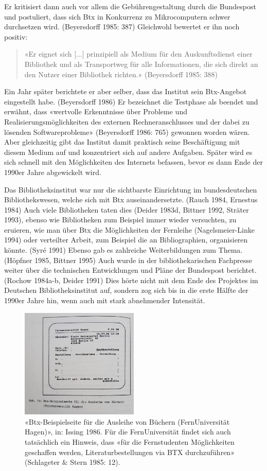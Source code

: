 \documentclass[a4paper,
fontsize=11pt,
oneside,
numbers=noperiodatend,
parskip=half-,
bibliography=totoc,
final
]{scrartcl}
\begin{document}
Er kritisiert dann auch vor allem die Gebührengestaltung durch die
Bundespost und postuliert, dass sich Btx in Konkurrenz zu Mikrocomputern
schwer durchsetzen wird. (Beyersdorff 1985: 387) Gleichwohl bewertet er
ihn noch positiv:

\begin{quote}
«Er eignet sich {[}...{]} prinzipiell als Medium für den Auskunftsdienst
einer Bibliothek und als Transportweg für alle Informationen, die sich
direkt an den Nutzer einer Bibliothek richten.» (Beyersdorff 1985: 388)
\end{quote}

Ein Jahr später berichtete er aber selber, dass das Institut sein
Btx-Angebot eingestellt habe. (Beyersdorff 1986) Er bezeichnet die
Testphase als beendet und erwähnt, dass «wertvolle Erkenntnisse über
Probleme und Realisierungsmöglichkeiten des externen Rechneranschlusses
und der dabei zu lösenden Softwareprobleme» (Beyersdorff 1986: 765)
gewonnen worden wären. Aber gleichzeitig gibt das Institut damit
praktisch seine Beschäftigung mit diesem Medium auf und konzentriert
sich auf andere Aufgaben. Später wird es sich schnell mit den
Möglichkeiten des Internets befassen, bevor es dann Ende der 1990er
Jahre abgewickelt wird.

Das Bibliotheksinstitut war nur die sichtbarste Einrichtung im
bundesdeutschen Bibliothekswesen, welche sich mit Btx auseinandersetzte.
(Rauch 1984, Ernestus 1984) Auch viele Bibliotheken taten dies (Deider
1983d, Bittner 1992, Sträter 1993), ebenso wie Bibliotheken zum Beispiel
immer wieder versuchten, zu eruieren, wie man über Btx die Möglichkeiten
der Fernleihe (Nagelsmeier-Linke 1994) oder verteilter Arbeit, zum
Beispiel die an Bibliographien, organisieren könnte. (Syré 1991) Ebenso
gab es zahlreiche Weiterbildungen zum Thema. (Höpfner 1985, Bittner
1995) Auch wurde in der bibliothekarischen Fachpresse weiter über die
technischen Entwicklungen und Pläne der Bundespost berichtet. (Rochow
1984a-b, Deider 1991) Dies hörte nicht mit dem Ende des Projektes im
Deutschen Bibliotheksinstitut auf, sondern zog sich bis in die erste
Hälfte der 1990er Jahre hin, wenn auch mit stark abnehmender Intensität.

\begin{figure}
\centering
\includegraphics[width=0.5\textwidth]{img/Btx_UBHagen.jpg}
\caption{«Btx-Beispielseite für die Ausleihe von
Büchern (FernUniversität Hagen)», in: Issing 1986. Für die
FernUniversität findet sich auch tatsächlich ein Hinweis, dass «für die
Fernstudenten Möglichkeiten geschaffen werden, Literaturbestellungen via
BTX durchzuführen» (Schlageter \& Stern 1985: 12).}
\end{figure}
\end{document}
